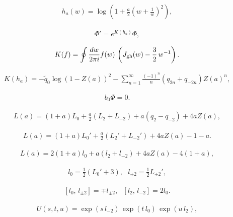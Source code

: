 \documentclass[]{article}
\begin{document}
\begin{eqnarray}
	\label{Eq:ha}
	h_a(w)=\log\left(1+\frac{a}{2}\left(w+\frac{1}{w}\right)^2\right),
\end{eqnarray}


\begin{eqnarray}
	\Phi'=e^{K(h_a)}\Phi,
\end{eqnarray}

\begin{eqnarray}
	K(f)=\oint\frac{dw}{2\pi i}f(w)\,
	\left(J_{\rm gh}(w)-\frac{3}{2}\,w^{-1}\right).
\end{eqnarray}

\begin{eqnarray}
	K(h_a)=-\tilde{q}_0 \log(1-Z(a))^2
	-\sum_{n=1}^\infty \frac{(-1)^n}{n}(q_{2n}+q_{-2n}) Z(a)^n,
\end{eqnarray}





\begin{eqnarray}
	b_0\Phi=0.
\end{eqnarray}



\begin{eqnarray}
	\label{Eq:La1}
	L(a)=(1+a)L_0 +\frac{a}{2}(L_2+L_{-2})+a(q_2-q_{-2})+4aZ(a),
\end{eqnarray}

\begin{eqnarray}
	\label{Eq:La2}
	L(a)=(1+a)L_0'+\frac{a}{2}(L_2'+L_{-2}')+4aZ(a)-1-a.
\end{eqnarray}

\begin{eqnarray}
	\label{Eq:La3}
	L(a)=2(1+a)l_0+a(l_2+l_{-2})+4aZ(a)-4(1+a),
\end{eqnarray}

\begin{eqnarray}
	l_0=\frac{1}{2}(L_0'+3),\ \ \ l_{\pm 2}=\frac{1}{2}L_{\pm 2}',
\end{eqnarray}

\begin{eqnarray}
	\label{Eq:SLcomrel}
	\left[l_0,\,l_{\pm 2}\right] = \mp l_{\pm 2},\ \ \ 
	\left[l_2,\,l_{-2}\right] = 2l_0.
\end{eqnarray}

\begin{eqnarray}
	\label{Eq:SLelemnt}
	U(s,t,u)=\exp(s\,l_{-2})\,\exp(t\,l_0)\,\exp(u\,l_2),
\end{eqnarray}
\end{document}
